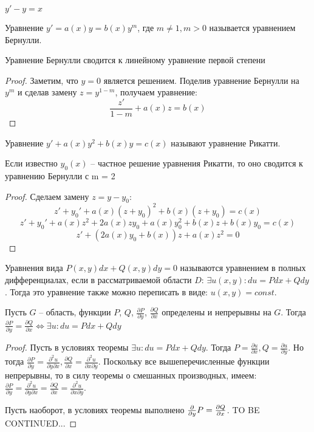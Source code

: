 \documentclass[document.tex]{subfiles}
\begin{document}
\begin{example}
$y' - y = x$
\end{example}
\begin{definition}
Уравнение $y' = a(x)y = b(x)y^m$, где $m \neq 1, m > 0$ называется уравнением Бернулли.
\end{definition}
\begin{statement}
Уравнение Бернулли сводится к линейному уравнение первой степени
\end{statement}
\begin{proof}
Заметим, что $y = 0$ является решением. Поделив уравнение Бернулли на $y^m$ и сделав замену $z = y^{1-m}$, получаем уравнение:
$$\frac{z'}{1-m} + a(x)z = b(x)$$
\end{proof}
\begin{definition}
Уравнение $y' + a(x)y^2 + b(x)y = c(x)$ называют уравнение Рикатти.
\end{definition}
\begin{statement}
Если известно $y_0(x)$ -- частное решение уравнения Рикатти, то оно сводится к уравнению Бернулли с m = 2
\end{statement}
\begin{proof}
Сделаем замену $z = y - y_0$:
$$z' + y_0' + a(x)(z+y_0)^2 + b(x)(z+y_0) = c(x)$$
$$z' + y_0' + a(x)z^2 + 2a(x)zy_0 + a(x)y_0^2 + b(x)z + b(x)y_0 = c(x)$$
$$z' + (2a(x)y_0 + b(x))z + a(x)z^2 = 0$$
\end{proof}
\begin{definition}
Уравнения вида $P(x, y)dx + Q(x, y)dy = 0$ называются уравнением в полных дифференциалах, если в рассматриваемой области $D$: $\exists u(x, y): du = Pdx + Qdy$. Тогда это уравнение также можно переписать в виде: $u(x, y) = const$.
\end{definition}
\begin{theorem}
Пусть $G$ -- область, функции $P$, $Q$, $\frac{\partial P}{\partial y}$, $\frac{\partial Q}{\partial x}$ определены и непрерывны на $G$. Тогда $\frac{\partial P}{\partial y} = \frac{\partial Q}{\partial x} \Leftrightarrow \exists u : du = Pdx + Qdy$
\end{theorem}
\begin{proof}
Пусть в условиях теоремы $\exists u : du = Pdx+Qdy$. Тогда $P = \frac{\partial u}{\partial x},
Q = \frac{\partial u}{\partial y}$. Но тогда $\frac{\partial P}{\partial y} = \frac{\partial^2 u}{\partial y \partial x}, \frac{\partial Q}{\partial x} = \frac{\partial ^2 u}{\partial x \partial y}$. Поскольку все вышеперечисленные функции непрерывны, то в силу теоремы о смешанных производных, имеем: $\frac{\partial P}{\partial y} = \frac{\partial^2 u}{\partial y \partial x} = \frac{\partial Q}{\partial x} = \frac{\partial ^2 u}{\partial x \partial y}$.

Пусть наоборот, в условиях теоремы выполнено $\frac{\partial}{\partial y}P = \frac{\partial Q}{\partial x}$.
TO BE CONTINUED...
\end{proof}
\end{document}
